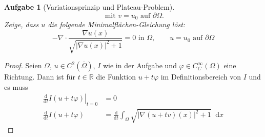 \documentclass{scrartcl}
\newcommand{\abs}[1]{\left\lvert #1 \right\rvert}
\newcommand{\restr}[2]{\left. #1 \right|_{#2}}
\newcommand{\intd}{\mathop{} \mathrm{d}}
\newcommand{\ableitung}[1]{
  \frac
    {\mathrm{d}}
    {\mathrm{d} #1}
  }
\newcommand{\Rand}[1]{\partial #1}
\newcommand{\reals}{\mathbb{R}}
\newcommand{\closure}[1]{\overline{#1}}
\newtheorem {problem} {Aufgabe}
\begin{document}
\begin{problem}[Variationsprinzip und Plateau-Problem]
\begin{equation}
    \text{ mit } v = u_0 \text{ auf } \Rand {\Omega}.
  \end{equation}
  Zeige, dass $u$ die folgende Minimalflächen-Gleichung löst:
  \begin{equation}
    - \nabla
    \cdot
    \frac
      {\nabla u(x)}
      {\sqrt{\abs{\nabla u(x)}^2 + 1}}
    = 0 \text{ in } \Omega, \qquad u = u_0 \text{ auf } \Rand{\Omega}
  \end{equation}

  \end{problem}

  \begin{proof}
    Seien $\Omega$, $u \in C^2(\closure{\Omega})$, $I$ wie in der Aufgabe
    und $\varphi \in C_C^{\infty}(\Omega)$ eine Richtung.
    Dann ist für $t \in \reals$ die Funktion $u + t\varphi$ im Definitionsbereich von $I$ und es muss
    \begin{align}
      \restr {\ableitung{t} I(u + t\varphi)}{t = 0} & = 0 \\
      \ableitung{t} I(u + t\varphi)  &=
      \ableitung{t} \int_{\Omega} \sqrt{
        \abs{
          \nabla(u+tv) (x)
        }^2 + 1
      } \intd x
    \end{align}
  \end{proof}
\end{document}
